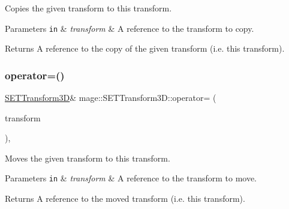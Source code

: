 Copies the given transform to this transform.


\begin{DoxyParams}[1]{Parameters}
\mbox{\tt in}  & {\em transform} & A reference to the transform to copy. \\
\hline
\end{DoxyParams}
\begin{DoxyReturn}{Returns}
A reference to the copy of the given transform (i.\+e. this transform). 
\end{DoxyReturn}
\mbox{\label{classmage_1_1_s_e_t_transform3_d_a75a49a24851f1d87898edf46313a2e0e}} 
\subsubsection{\texorpdfstring{operator=()}{operator=()}\hspace{0.1cm}{\footnotesize\ttfamily [2/2]}}
{\footnotesize\ttfamily \mbox{\hyperlink{classmage_1_1_s_e_t_transform3_d}{S\+E\+T\+Transform3D}}\& mage\+::\+S\+E\+T\+Transform3\+D\+::operator= (\begin{DoxyParamCaption}\item[{\mbox{\hyperlink{classmage_1_1_s_e_t_transform3_d}{S\+E\+T\+Transform3D}} \&\&}]{transform }\end{DoxyParamCaption})\hspace{0.3cm}{\ttfamily [default]}, {\ttfamily [noexcept]}}

Moves the given transform to this transform.


\begin{DoxyParams}[1]{Parameters}
\mbox{\tt in}  & {\em transform} & A reference to the transform to move. \\
\hline
\end{DoxyParams}
\begin{DoxyReturn}{Returns}
A reference to the moved transform (i.\+e. this transform). 
\end{DoxyReturn}
\mbox{\label{classmage_1_1_s_e_t_transform3_d_a958f27ee959faf45b73dd223351cfac2}} 
